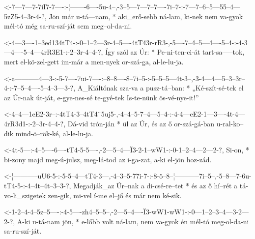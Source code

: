   {<-7---7---7-7iI7-7----:-¦-------6----5u-4--,-3--5---7---7--7----7i--7-:-7---7--6--5---55--4---5zZ5-4--3r-4-?,}
  {  Jön már u-tá---nam, * aki_erő-sebb ná-lam, ki-nek nem va-gyok mél-tó  még sa-ru-szí-ját sem meg--ol-da-ni.}


  {<-4---3----1--3ed134tT4-:-0--1--2---3r-4--5----4tT43r-rR3-,-5----7--4--5---4----5--4-:-4-3---4----5--4---4rR3E1-:-2--3r-4--4-?,}
  {  Így szól az Úr:       * Pe-ni-ten-ci-át tart-sa-----tok,  mert el-kö-zel-gett im-már a men-nyek or-szá-ga,      al-le-lu-ja.}


  {<-¢-----------4---3-:-5-7----7ui-7----:--8--8----8--7i--5-:-5--5--5---4t-3--,-3-4---4---5--3--3r--4-:-7--5--4----5--4--3---3-?,}
  {  A_Kiáltónak sza-va  a pusz-tá--ban: * „Ké-szít-sé-tek el  az Úr-nak út-ját, e-gye-nes-sé te-gyé-tek Is-te-nünk ös-vé-nye-it!”}


  {<-4--4---1eE2-3r--:-4tT4-3--4tT4¨5uj5-,-4--4--5-7--4---5--4-:-4-4---eE2-1---3----4t-4---4rR3d1-:-2--3r-4--4-?,}
  {  Dá-vid trón-ján * ül   az Úr,         és az ő or-szá-gá-ban u-ral-ko--dik mind-ö--rök-ké,      al-le-lu-ja.}

  {<-4t-5---:-4--5----6----tT4-5-5----,-2---5--4---Ï3-2-1--wW1-:-0-1--2--4---2---2-?,}
  {  Si-on, * bi-zony majd meg-ú-julsz, meg-lá-tod az i-ga-zat,  a-ki el-jön hoz-zád.}


  {<-¦-----------uU6-5-:-5-5--4---tT4-3---,-4--3--5-77i-7-:-8-ö--8--¦-----------7i--5--,-5--8---7-6u-tT4-5-:-4--4t--4t--3--3-?,}
  {  Megadják_az Úr--nak a di-csé-re--tet * és az ő hí--rét a tá-vo-li_szigetek zen-gik, mi-vel í-me el--jő  és már nem ké-sik.}

  {<-1-2--4-4--5z--5----:-4-5----zh4--5--5--,-2---5--4----Ï3-wW1-wW1-:-0---1--2--3--4--–3-2---2-?,}
  {  A-ki u-tá-nam jön, * e-lőbb volt ná-lam, nem va-gyok én mél-tó    meg-ol-da-ni sa-ru-szí-ját.}


